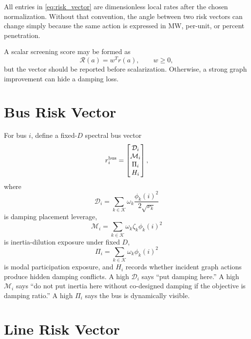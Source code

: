 All entries in \eqref{eq:risk_vector} are dimensionless local rates after the
chosen normalization. Without that convention, the angle between two risk
vectors can change simply because the same action is expressed in MW, per-unit,
or percent penetration.

A scalar screening score may be formed as
\begin{equation}
  \mathcal R(a)=w^Tr(a),\qquad w\ge0,
  \label{eq:scalar_risk_score}
\end{equation}
but the vector should be reported before scalarization. Otherwise, a strong
graph improvement can hide a damping loss.

\section{Bus Risk Vector}

For bus \(i\), define a fixed-\(D\) spectral bus vector
\begin{equation}
  r_i^{\rm bus}=
  \begin{bmatrix}
  \mathcal D_i\\
  \mathcal M_i\\
  \Pi_i\\
  H_i
  \end{bmatrix},
  \label{eq:bus_risk_vector}
\end{equation}
where
\begin{equation}
  \mathcal D_i=
  \sum_{k\in\mathcal K}
  \omega_k
  \frac{\phi_k(i)^2}{2\sqrt{\nu_k}}
  \label{eq:bus_D_score}
\end{equation}
is damping placement leverage,
\begin{equation}
  \mathcal M_i=
  \sum_{k\in\mathcal K}
  \omega_k\zeta_k\phi_k(i)^2
  \label{eq:bus_M_score}
\end{equation}
is inertia-dilution exposure under fixed \(D\),
\begin{equation}
  \Pi_i=
  \sum_{k\in\mathcal K}\omega_k\phi_k(i)^2
  \label{eq:bus_participation_score}
\end{equation}
is modal participation exposure, and \(H_i\) records whether incident graph
actions produce hidden damping conflicts. A high \(\mathcal D_i\) says
``put damping here.'' A high \(\mathcal M_i\) says ``do not put inertia here
without co-designed damping if the objective is damping ratio.'' A high
\(\Pi_i\) says the bus is dynamically visible.

\section{Line Risk Vector}

